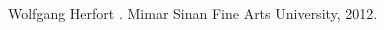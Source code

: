 \documentclass[a4paper, 14pt]{report}
\begin{document}
\begin{onehalfspace}
{\begin{thebibliography}{99}
				
				Wolfgang Herfort  
				.  
				\newblock Mimar Sinan Fine Arts University, 2012.  
				
				
				
				
				
				
				
				
				
				
				
			\end{thebibliography}
			
		}
		
		
	\end{onehalfspace} 
	
	
	
	
	
	
\end{document}
